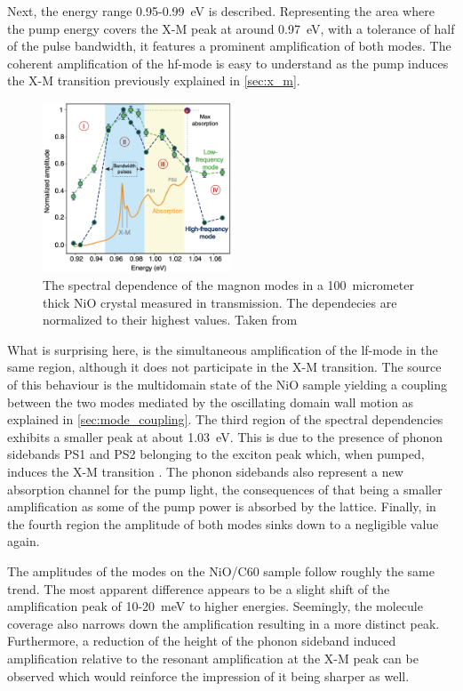 Next, the energy range 0.95-\qty{0.99}{eV} is described.
Representing the area where the pump energy covers the X-M peak at around \qty{0.97}{eV}, with a tolerance of half of the pulse bandwidth, it features a prominent amplification of both modes.
The coherent amplification of the hf-mode is easy to understand as the pump induces the X-M transition previously explained in \autoref{sec:x_m}.
\begin{figure}[ht]
    \centering
    \includegraphics[width=0.5\textwidth]{pictures/7.png}
    \caption{The spectral dependence of the magnon modes in a \qty{100}{micrometer} thick NiO crystal measured in transmission. The dependecies are normalized to their highest values. Taken from }
    \label{fig:7}
\end{figure}
\FloatBarrier
What is surprising here, is the simultaneous amplification of the lf-mode in the same region, although it does not participate in the X-M transition.
The source of this behaviour is the multidomain state of the NiO sample yielding a coupling between the two modes mediated by the oscillating domain wall motion as explained in \autoref{sec:mode_coupling}.
The third region of the spectral dependencies exhibits a smaller peak at about \qty{1.03}{eV}.
This is due to the presence of phonon sidebands PS1 and PS2 belonging to the exciton peak which, when pumped, induces the X-M transition .
The phonon sidebands also represent a new absorption channel for the pump light, the consequences of that being a smaller amplification as some of the pump power is absorbed by the lattice.
Finally, in the fourth region the amplitude of both modes sinks down to a negligible value again.

The amplitudes of the modes on the NiO/C60 sample follow roughly the same trend.
The most apparent difference appears to be a slight shift of the amplification peak of 10-\qty{20}{meV} to higher energies.
Seemingly, the molecule coverage also narrows down the amplification resulting in a more distinct peak.
Furthermore, a reduction of the height of the phonon sideband induced amplification relative to the resonant amplification at the X-M peak can be observed which would reinforce the impression of it being sharper as well.

